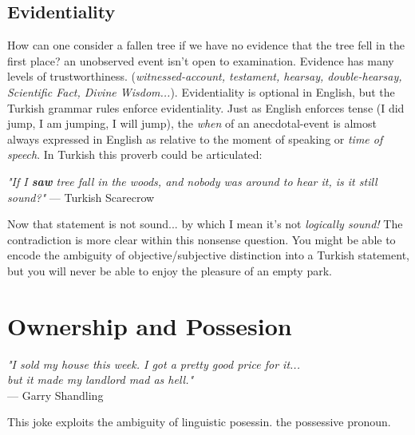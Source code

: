 \subsection{Evidentiality}
How can one consider a fallen tree if we have no evidence that the tree fell in the first place? an unobserved event isn't open to examination. Evidence has many levels of trustworthiness. (\textit{witnessed-account, testament, hearsay, double-hearsay, Scientific Fact, Divine Wisdom...}). Evidentiality is optional in English, but the Turkish grammar rules enforce evidentiality. Just as English enforces tense (I did jump, I am jumping, I will jump), the \textit{when} of an anecdotal-event is almost always expressed in English as relative to the moment of speaking or \textit{time of speech}.
In Turkish this proverb could be articulated:

\begin{center}
\textit{"If I \textbf{saw} tree fall in the woods, and nobody was around to hear it, is it still sound?"}
--- Turkish Scarecrow
\end{center}

Now that statement is not sound... by which I mean it's not \textit{logically sound!} The contradiction is more clear within this nonsense question. You might be able to encode the ambiguity of objective/subjective distinction into a Turkish statement, but you will never be able to enjoy the pleasure of an empty park.


\newpage
\section{Ownership and Possesion}

\begin{center}
\textit{"I sold my house this week. I got a pretty good price for it...\\ but it made my landlord mad as hell."} 
\\ --- Garry Shandling
\end{center}

This joke exploits the ambiguity of linguistic posessin. the possessive pronoun.

